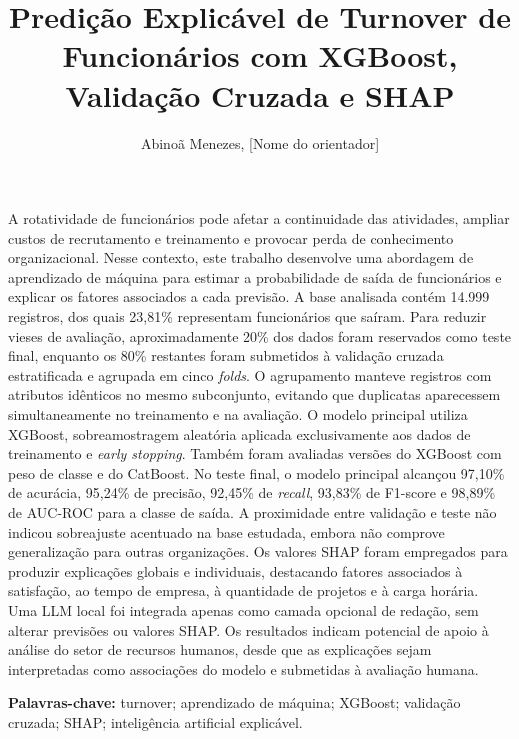 \documentclass[12pt]{article}
\title{Predição Explicável de Turnover de Funcionários com XGBoost, Validação Cruzada e SHAP}
\author{Abinoã Menezes\inst{1}, [Nome do orientador]\inst{1}}
\begin{document}
\maketitle

\begin{resumo}
A rotatividade de funcionários pode afetar a continuidade das atividades, ampliar custos de recrutamento e treinamento e provocar perda de conhecimento organizacional. Nesse contexto, este trabalho desenvolve uma abordagem de aprendizado de máquina para estimar a probabilidade de saída de funcionários e explicar os fatores associados a cada previsão. A base analisada contém 14.999 registros, dos quais 23,81\% representam funcionários que saíram. Para reduzir vieses de avaliação, aproximadamente 20\% dos dados foram reservados como teste final, enquanto os 80\% restantes foram submetidos à validação cruzada estratificada e agrupada em cinco \textit{folds}. O agrupamento manteve registros com atributos idênticos no mesmo subconjunto, evitando que duplicatas aparecessem simultaneamente no treinamento e na avaliação. O modelo principal utiliza XGBoost, sobreamostragem aleatória aplicada exclusivamente aos dados de treinamento e \textit{early stopping}. Também foram avaliadas versões do XGBoost com peso de classe e do CatBoost. No teste final, o modelo principal alcançou 97,10\% de acurácia, 95,24\% de precisão, 92,45\% de \textit{recall}, 93,83\% de F1-score e 98,89\% de AUC-ROC para a classe de saída. A proximidade entre validação e teste não indicou sobreajuste acentuado na base estudada, embora não comprove generalização para outras organizações. Os valores SHAP foram empregados para produzir explicações globais e individuais, destacando fatores associados à satisfação, ao tempo de empresa, à quantidade de projetos e à carga horária. Uma LLM local foi integrada apenas como camada opcional de redação, sem alterar previsões ou valores SHAP. Os resultados indicam potencial de apoio à análise do setor de recursos humanos, desde que as explicações sejam interpretadas como associações do modelo e submetidas à avaliação humana.

\textbf{Palavras-chave:} turnover; aprendizado de máquina; XGBoost; validação cruzada; SHAP; inteligência artificial explicável.
\end{resumo}
\end{document}
